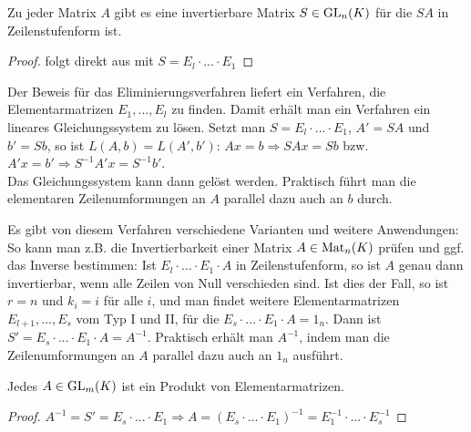 \begin{conclusion}
	Zu jeder Matrix $A$ gibt es eine invertierbare Matrix $S\in \operatorname{GL}_n(K)$ für die $SA$ in Zeilenstufenform ist.
\end{conclusion}
\begin{proof}
	folgt direkt aus  mit $S=E_l\cdot ... \cdot E_1$
\end{proof}

\begin{remark}
	Der Beweis für das Eliminierungsverfahren liefert ein Verfahren, die Elementarmatrizen $E_1,...,E_l$ zu finden. 
	Damit erhält man ein Verfahren ein lineares Gleichungssystem zu lösen. Setzt man $S=E_l\cdot ... \cdot E_1$, $A'=SA$ und $b'=Sb$, so 
	ist $L(A,b)=L(A',b')$: $Ax=b\Rightarrow SAx=Sb$ bzw. $A'x=b' \Rightarrow S^{-1}A'x=S^{-1}b'$. \\
	Das Gleichungssystem kann dann gelöst werden. Praktisch führt man die elementaren Zeilenumformungen an $A$ parallel dazu auch an $b$ 
	durch.
\end{remark}

\begin{remark}
	Es gibt von diesem Verfahren verschiedene Varianten und weitere Anwendungen: So kann man z.B. die Invertierbarkeit 
	einer Matrix $A\in \operatorname{Mat}_n(K)$ prüfen und ggf. das Inverse bestimmen: Ist $E_l\cdot ... \cdot E_1\cdot A$ in Zeilenstufenform, so ist $A$ 
	genau dann invertierbar, wenn alle Zeilen von Null verschieden sind. Ist dies der Fall, so ist $r=n$ und $k_i=i$ für alle $i$, 
	und man findet weitere Elementarmatrizen $E_{l+1},...,E_s$ vom Typ I und II, für die $E_s\cdot ... \cdot E_1\cdot A=1_n$. Dann ist 
	$S'=E_s\cdot ... \cdot E_1\cdot A=A^{-1}$. Praktisch erhält man $A^{-1}$, indem man die Zeilenumformungen an $A$ parallel dazu 
	auch an $1_n$ ausführt.
\end{remark}

\begin{conclusion}
	Jedes $A\in \operatorname{GL}_m(K)$ ist ein Produkt von Elementarmatrizen.
\end{conclusion}
\begin{proof}
	$A^{-1}=S'=E_s\cdot ... \cdot E_1 \Rightarrow A=(E_s\cdot ... \cdot E_1)^{-1}=E_1^{-1}\cdot ... \cdot E_s^{-1}$
\end{proof}
